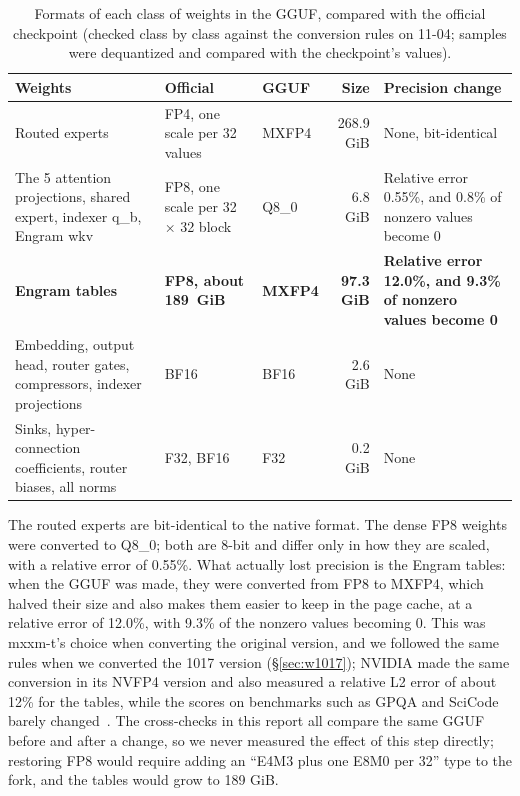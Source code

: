 \documentclass[11pt,a4paper]{article}
\begin{document}
\begin{table}[h]
  \centering
  \small
  \caption{Formats of each class of weights in the GGUF, compared with the official checkpoint (checked class by class against the conversion rules on 11-04; samples were dequantized and compared with the checkpoint's values).}
  \label{tab:formats}
  \begin{tabularx}{\textwidth}{@{}>{\raggedright\arraybackslash}p{4.3cm} >{\raggedright\arraybackslash}p{2.8cm} l r >{\raggedright\arraybackslash}X@{}}
    \toprule
    Weights & Official & GGUF & Size & Precision change \\
    \midrule
    Routed experts & FP4, one scale per 32 values & MXFP4 & 268.9 GiB & None, bit-identical \\
    The 5 attention projections, shared expert, indexer q\_b, Engram wkv & FP8, one scale per 32 × 32 block & Q8\_0 & 6.8 GiB & Relative error 0.55\%, and 0.8\% of nonzero values become 0 \\
    \textbf{Engram tables} & \textbf{FP8, about 189~GiB} & \textbf{MXFP4} & \textbf{97.3 GiB} & \textbf{Relative error 12.0\%, and 9.3\% of nonzero values become 0} \\
    Embedding, output head, router gates, compressors, indexer projections & BF16 & BF16 & 2.6 GiB & None \\
    Sinks, hyper-connection coefficients, router biases, all norms & F32, BF16 & F32 & 0.2 GiB & None \\
    \bottomrule
  \end{tabularx}
\end{table}

The routed experts are bit-identical to the native format. The dense FP8 weights were converted to Q8\_0; both are 8-bit and differ only in how they are scaled, with a relative error of 0.55\%. What actually lost precision is the Engram tables: when the GGUF was made, they were converted from FP8 to MXFP4, which halved their size and also makes them easier to keep in the page cache, at a relative error of 12.0\%, with 9.3\% of the nonzero values becoming 0. This was mxxm-t's choice when converting the original version, and we followed the same rules when we converted the 1017 version (\S\ref{sec:w1017}); NVIDIA made the same conversion in its NVFP4 version and also measured a relative L2 error of about 12\% for the tables, while the scores on benchmarks such as GPQA and SciCode barely changed~\cite{nvfp4}. The cross-checks in this report all compare the same GGUF before and after a change, so we never measured the effect of this step directly; restoring FP8 would require adding an ``E4M3 plus one E8M0 per 32'' type to the fork, and the tables would grow to 189 GiB.
\end{document}

